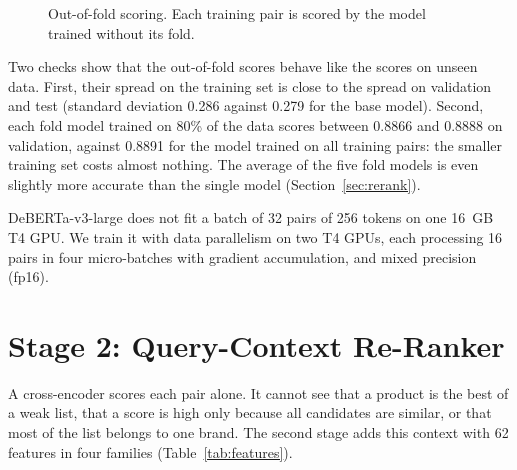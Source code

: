 \documentclass[12pt,a4paper]{report}
\begin{document}
\begin{figure}[H]
\centering
{}
\caption{Out-of-fold scoring. Each training pair is scored by the model trained without its fold.}
\label{fig:oof}
\end{figure}

Two checks show that the out-of-fold scores behave like the scores on unseen data. First, their spread on the training set is close to the spread on validation and test (standard deviation 0.286 against 0.279 for the base model). Second, each fold model trained on 80\% of the data scores between 0.8866 and 0.8888 on validation, against 0.8891 for the model trained on all training pairs: the smaller training set costs almost nothing. The average of the five fold models is even slightly more accurate than the single model (Section~\ref{sec:rerank}).

DeBERTa-v3-large does not fit a batch of 32 pairs of 256 tokens on one 16~GB T4 GPU. We train it with data parallelism on two T4 GPUs, each processing 16 pairs in four micro-batches with gradient accumulation, and mixed precision (fp16).

\section{Stage 2: Query-Context Re-Ranker}
A cross-encoder scores each pair alone. It cannot see that a product is the best of a weak list, that a score is high only because all candidates are similar, or that most of the list belongs to one brand. The second stage adds this context with 62 features in four families (Table~\ref{tab:features}).
\end{document}
